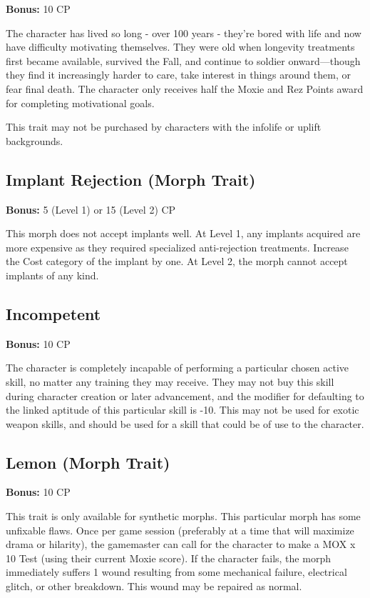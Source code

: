 \textbf{Bonus:} 10 CP

The character has lived so long - over 100 years - they’re bored with life and now have difficulty motivating themselves. They were old when longevity treatments first became available, survived the Fall, and continue to soldier onward—though they find it increasingly harder to care, take interest in things around them, or fear final death. The character only receives half the Moxie and Rez Points award for completing motivational goals.

This trait may not be purchased by characters with the infolife or uplift backgrounds.

\subsection{Implant Rejection (Morph Trait)}
\label{sec:traits-implant-rejection}

\textbf{Bonus:} 5 (Level 1) or 15 (Level 2) CP

This morph does not accept implants well. At Level 1, any implants acquired are more expensive as they required specialized anti-rejection treatments. Increase the Cost category of the implant by one. At Level 2, the morph cannot accept implants of any kind.

\subsection{Incompetent}
\label{sec:traits-incompetent}

\textbf{Bonus:} 10 CP

The character is completely incapable of performing a particular chosen active skill, no matter any training they may receive. They may not buy this skill during character creation or later advancement, and the modifier for defaulting to the linked aptitude of this particular skill is -10. This may not be used for exotic weapon skills, and should be used for a skill that could be of use to the character.

\subsection{Lemon (Morph Trait)}
\label{sec:traits-lemon}

\textbf{Bonus:} 10 CP

This trait is only available for synthetic morphs. This particular morph has some unfixable flaws. Once per game session (preferably at a time that will maximize drama or hilarity), the gamemaster can call for the character to make a MOX x 10 Test (using their current Moxie score). If the character fails, the morph immediately suffers 1 wound resulting from some mechanical failure, electrical glitch, or other breakdown. This wound may be repaired as normal.

